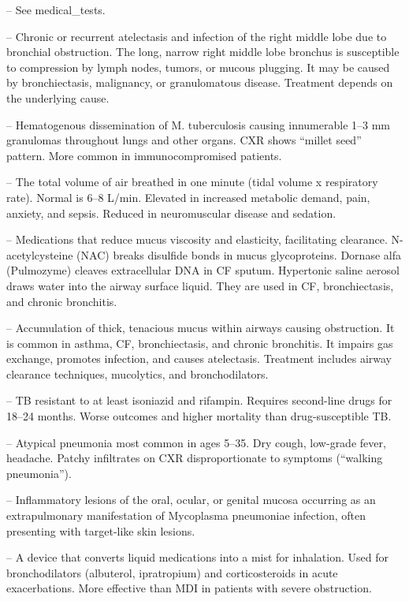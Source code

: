 -- See medical\_tests.

-- Chronic or recurrent atelectasis and infection of the right middle lobe due to bronchial obstruction. The long, narrow right middle lobe bronchus is susceptible to compression by lymph nodes, tumors, or mucous plugging. It may be caused by bronchiectasis, malignancy, or granulomatous disease. Treatment depends on the underlying cause.

-- Hematogenous dissemination of M. tuberculosis causing innumerable 1--3 mm granulomas throughout lungs and other organs. CXR shows ``millet seed'' pattern. More common in immunocompromised patients.

-- The total volume of air breathed in one minute (tidal volume x respiratory rate). Normal is 6--8 L/min. Elevated in increased metabolic demand, pain, anxiety, and sepsis. Reduced in neuromuscular disease and sedation.

-- Medications that reduce mucus viscosity and elasticity, facilitating clearance. N-acetylcysteine (NAC) breaks disulfide bonds in mucus glycoproteins. Dornase alfa (Pulmozyme) cleaves extracellular DNA in CF sputum. Hypertonic saline aerosol draws water into the airway surface liquid. They are used in CF, bronchiectasis, and chronic bronchitis.

-- Accumulation of thick, tenacious mucus within airways causing obstruction. It is common in asthma, CF, bronchiectasis, and chronic bronchitis. It impairs gas exchange, promotes infection, and causes atelectasis. Treatment includes airway clearance techniques, mucolytics, and bronchodilators.

-- TB resistant to at least isoniazid and rifampin. Requires second-line drugs for 18--24 months. Worse outcomes and higher mortality than drug-susceptible TB.

-- Atypical pneumonia most common in ages 5--35. Dry cough, low-grade fever, headache. Patchy infiltrates on CXR disproportionate to symptoms (``walking pneumonia'').

-- Inflammatory lesions of the oral, ocular, or genital mucosa occurring as an extrapulmonary manifestation of Mycoplasma pneumoniae infection, often presenting with target-like skin lesions.

-- A device that converts liquid medications into a mist for inhalation. Used for bronchodilators (albuterol, ipratropium) and corticosteroids in acute exacerbations. More effective than MDI in patients with severe obstruction.

